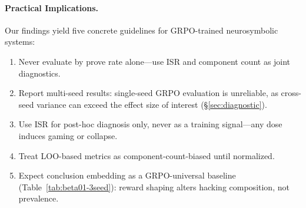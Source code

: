 \paragraph{Practical Implications.}
Our findings yield five concrete guidelines for GRPO-trained neurosymbolic systems:
\begin{enumerate}[nosep,leftmargin=*]
\item Never evaluate by prove rate alone---use ISR and component count as joint diagnostics.
\item Report multi-seed results: single-seed GRPO evaluation is unreliable, as cross-seed variance can exceed the effect size of interest (\S\ref{sec:diagnostic}).
\item Use ISR for post-hoc diagnosis only, never as a training signal---any dose induces gaming or collapse.
\item Treat LOO-based metrics as component-count-biased until normalized.
\item Expect conclusion embedding as a GRPO-universal baseline (Table~\ref{tab:beta01-3seed}): reward shaping alters hacking composition, not prevalence.
\end{enumerate}
